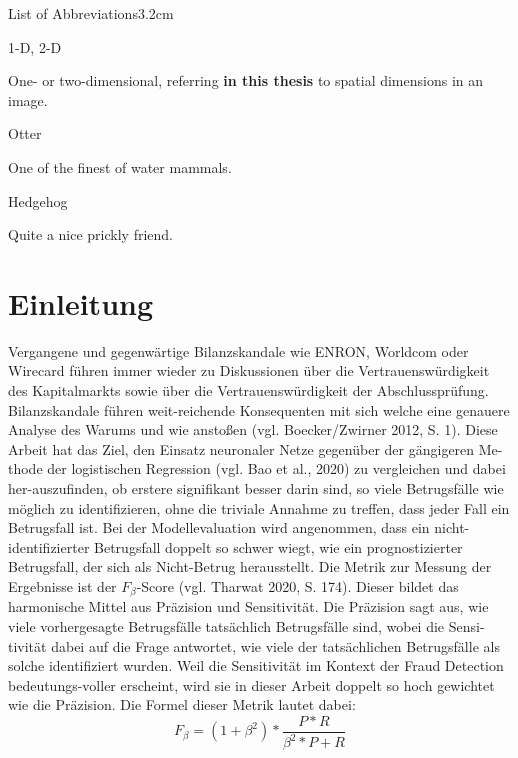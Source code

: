 \documentclass[a4paper, nobind]{templates/ociamthesis}
\begin{document}
\begin{romanpages}
\begin{mclistof}{List of Abbreviations}{3.2cm}
\item[1-D, 2-D]

One- or two-dimensional, referring \textbf{in this thesis} to spatial dimensions in an image.

\item[Otter]

One of the finest of water mammals.

\item[Hedgehog]

Quite a nice prickly friend.

\end{mclistof} 


\end{romanpages}

\flushbottom

\hypertarget{intro}{%
\chapter{Einleitung}\label{intro}}

Vergangene und gegenwärtige Bilanzskandale wie ENRON, Worldcom oder Wirecard führen immer wieder zu Diskussionen über die Vertrauenswürdigkeit des Kapitalmarkts sowie über die Vertrauenswürdigkeit der Abschlussprüfung. Bilanzskandale führen weit-reichende Konsequenten mit sich welche eine genauere Analyse des Warums und wie anstoßen (vgl. Boecker/Zwirner 2012, S. 1).
Diese Arbeit hat das Ziel, den Einsatz neuronaler Netze gegenüber der gängigeren Me-thode der logistischen Regression (vgl. Bao et al., 2020) zu vergleichen und dabei her-auszufinden, ob erstere signifikant besser darin sind, so viele Betrugsfälle wie möglich zu identifizieren, ohne die triviale Annahme zu treffen, dass jeder Fall ein Betrugsfall ist. Bei der Modellevaluation wird angenommen, dass ein nicht-identifizierter Betrugsfall doppelt so schwer wiegt, wie ein prognostizierter Betrugsfall, der sich als Nicht-Betrug herausstellt.
Die Metrik zur Messung der Ergebnisse ist der \(F_{\beta}\)-Score (vgl. Tharwat 2020, S. 174). Dieser bildet das harmonische Mittel aus Präzision und Sensitivität. Die Präzision sagt aus, wie viele vorhergesagte Betrugsfälle tatsächlich Betrugsfälle sind, wobei die Sensi-tivität dabei auf die Frage antwortet, wie viele der tatsächlichen Betrugsfälle als solche identifiziert wurden. Weil die Sensitivität im Kontext der Fraud Detection bedeutungs-voller erscheint, wird sie in dieser Arbeit doppelt so hoch gewichtet wie die Präzision. Die Formel dieser Metrik lautet dabei:
\[F_{\beta} = (1+\beta^{2})*\frac{P*R}{\beta^{2} * P+R}\]
\end{document}
